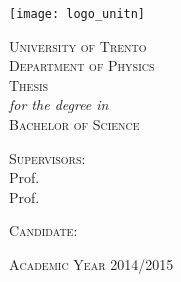 
\graphicspath{{Frontmatter/figures/PNG/}{Frontmatter/figures/PDF/}{Frontmatter/figures/}}

\begin{titlepage}
	
	\begin{center}
	
		\texttt{[image: logo\_unitn]}\\[0.4cm]
			
		\vspace{0.8cm}
		
		{ \Huge \scshape University of Trento }\\[0.25cm]
		{ \Large \scshape Department of Physics }\\[2cm]

		{ \Large \scshape Thesis }\\[0.05cm]
		{ \itshape for the degree in }\\[0.05cm]
		{ \Large \scshape Bachelor of Science }\\[2cm]
		
		
		{ \huge \bfseries \THtitle }
		
		\vfill
				
		\begin{minipage}[t]{0.45\textwidth}
			\begin{flushleft} %
				{ \large \scshape Supervisors: } \\[0.25cm]
				{ Prof. \THsupervisor }\\[0.10cm]
				{ Prof. \THextrasupervisor }
			\end{flushleft}
		\end{minipage}
		\begin{minipage}[t]{0.45\textwidth}
			\begin{flushright} %
				{ \large \scshape Candidate: }\\[0.25cm]
				{ \THauthor }
			\end{flushright}
		\end{minipage}
		
		\vspace{2cm}
		
		{\large \scshape Academic Year 2014/2015}
		
	\end{center}
	
	\restoregeometry
\end{titlepage}